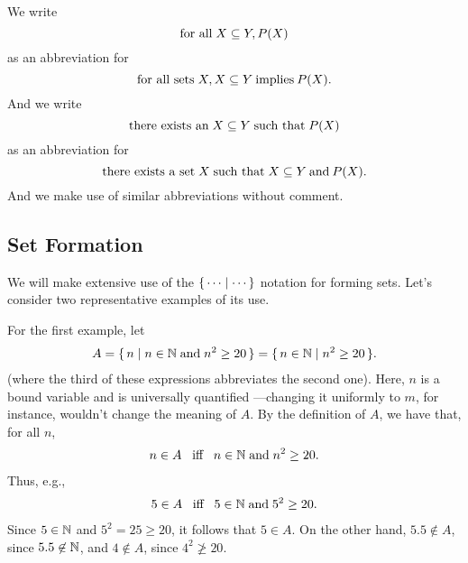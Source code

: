 We write
\begin{displaymath}
  \textrm{for all}\; X \subseteq Y, P(X)
\end{displaymath}
as an abbreviation for
\begin{displaymath}
  \textrm{for all sets}\; X, X\subseteq Y \mathbin{\textrm{implies}} P(X) .
\end{displaymath}
And we write 
\begin{displaymath}
  \textrm{there exists an}\; X \subseteq Y \;\textrm{such that}\; P(X)
\end{displaymath}
as an abbreviation for
\begin{displaymath}
  \textrm{there exists a set}\; X \;\textrm{such that}\; X\subseteq Y
  \mathbin{\textrm{and}} P(X) .
\end{displaymath}
And we make use of similar abbreviations without comment.

\subsection{Set Formation}

We will make extensive use of the $\{ \, \cdots \mid \cdots \, \}$ notation
for forming sets.
%
%
%
%
Let's consider two representative examples of its use.

For the first example, let
\begin{gather*}
A=\{ \, n \mid n\in\mathbb{N}\;\allowbreak\mbox{and}\allowbreak\;n^2\geq 20 \, \}
 =\{ \, n\in\mathbb{N} \mid n^2\geq 20 \, \}.
\end{gather*}
(where the third of these expressions abbreviates the second one).
Here, $n$ is a bound variable
%
and is universally quantified%
%
%
---changing it uniformly to $m$, for instance, wouldn't change the
meaning of $A$.  By the definition of $A$, we have that, for all $n$,
\begin{gather*}
n\in A\mathrel{\;\;\allowbreak\mbox{iff}\allowbreak\;\;} n\in\mathbb{N}\;\allowbreak\mbox{and}\allowbreak\;n^2\geq 20.
\end{gather*}
Thus, e.g.,
\begin{gather*}
5\in A\mathrel{\;\;\allowbreak\mbox{iff}\allowbreak\;\;} 5\in\mathbb{N}\;\allowbreak\mbox{and}\allowbreak\;5^2\geq 20 .
\end{gather*}
Since $5\in\mathbb{N}$ and $5^2=25\geq 20$, it follows that $5\in A$.  On
the other hand, $5.5\not\in A$, since $5.5\not\in\mathbb{N}$, and $4\not\in A$,
since $4^2\not\geq 20$.

